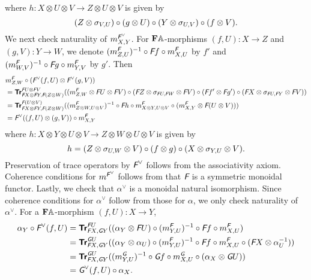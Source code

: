 where $h \colon X \otimes U \otimes V \to Z \otimes U \otimes V$ is given by
\begin{equation*}
  (Z \otimes \sigma_{V,U}) \circ (g \otimes U) \circ (Y \otimes \sigma_{U,V})
  \circ (f \otimes V).
\end{equation*}
We next check naturality of $m^{\textit{\textsf{F}}^{\vee}}_{X,Y}$. For
$\mathbf{F}\mathbb{A}$-morphisms $(f,U) \colon X \to Z$ and $(g,V) \colon Y
\to W$, we denote $(m^{\textit{\textsf{F}}}_{Z,U})^{-1} \circ \textit{\textsf{F}}f \circ m^{\textit{\textsf{F}}}_{X,U}$ by
$f'$ and $(m_{W,V}^{\textit{\textsf{F}}})^{-1} \circ \textit{\textsf{F}}g \circ m^{\textit{\textsf{F}}}_{Y,V}$ by $g'$. Then
\begin{align*}
  & m^{\textit{\textsf{F}}}_{Z,W} \circ (\textit{\textsf{F}}^{\vee}(f,U) \otimes \textit{\textsf{F}}^{\vee}(g,V)) \\
  &= {\normalfont\textsf{\textbf{Tr}}}^{\textit{\textsf{F}}U \otimes \textit{\textsf{F}}V}_{\textit{\textsf{F}}X \otimes \textit{\textsf{F}}Y,\textit{\textsf{F}}(Z \otimes W)}
  ((m^{\textit{\textsf{F}}}_{Z,W} \otimes \textit{\textsf{F}}U \otimes \textit{\textsf{F}}V) \circ
  (\textit{\textsf{F}}Z \otimes \sigma_{\textit{\textsf{F}}U,\textit{\textsf{F}}W} \otimes \textit{\textsf{F}}V) \circ
  (\textit{\textsf{F}}f' \otimes \textit{\textsf{F}}g') \circ
  (\textit{\textsf{F}}X \otimes \sigma_{\textit{\textsf{F}}U,\textit{\textsf{F}}Y} \otimes \textit{\textsf{F}}V)) \\
  &= {\normalfont\textsf{\textbf{Tr}}}^{\textit{\textsf{F}}(U \otimes V)}_{\textit{\textsf{F}}X \otimes \textit{\textsf{F}}Y,\textit{\textsf{F}}(Z \otimes W)}
  ((m_{Z \otimes W, U \otimes V}^{\textit{\textsf{F}}})^{-1} \circ
  \textit{\textsf{F}}h \circ
  m_{X \otimes Y, U \otimes V}^{\textit{\textsf{F}}} \circ
  (m_{X,Y}^{\textit{\textsf{F}}} \otimes \textit{\textsf{F}}(U \otimes V))) \\
  &= \textit{\textsf{F}}^{\vee}((f,U) \otimes (g,V)) \circ m^{\textit{\textsf{F}}}_{X,Y}
\end{align*}
where $h \colon X \otimes Y \otimes U \otimes V \to Z \otimes W \otimes U \otimes V$
is given by
\begin{equation*}
  h = (Z \otimes \sigma_{U,W} \otimes V) \circ (f \otimes g) \circ
  (X \otimes \sigma_{Y,U} \otimes V).
\end{equation*}
Preservation of trace operators by $\textit{\textsf{F}}^{\vee}$ follows from
the associativity axiom. Coherence conditions for
$m^{\textit{\textsf{F}}^{\vee}}$ follows from that $\textit{\textsf{F}}$ is a symmetric
monoidal functor. Lastly, we check that $\alpha^{\vee}$ is a
monoidal natural isomorphism. Since coherence conditions for
$\alpha^{\vee}$ follow from those for $\alpha$, we only check
naturality of $\alpha^{\vee}$. For a $\mathbf{F}\mathbb{A}$-morphism $(f,U)
\colon X \to Y$,
\begin{align*}
  \alpha_{Y} \circ \textit{\textsf{F}}^{\vee}(f,U)
  &= {\normalfont\textsf{\textbf{Tr}}}^{\textit{\textsf{F}}U}_{\textit{\textsf{F}}X,\textit{\textsf{G}}Y}
  ((\alpha_{Y} \otimes \textit{\textsf{F}}U) \circ
  (m^{\textit{\textsf{F}}}_{Y,U})^{-1} \circ \textit{\textsf{F}}f \circ m^{\textit{\textsf{F}}}_{X,U}) \\
  &= {\normalfont\textsf{\textbf{Tr}}}^{\textit{\textsf{G}}U}_{\textit{\textsf{F}}X,\textit{\textsf{G}}Y}((\alpha_{Y} \otimes \alpha_{U}) \circ
  (m^{\textit{\textsf{F}}}_{Y,U})^{-1} \circ \textit{\textsf{F}}f \circ m^{\textit{\textsf{F}}}_{X,U}
  \circ (\textit{\textsf{F}}X \otimes \alpha^{-1}_{U})) \\
  &= {\normalfont\textsf{\textbf{Tr}}}^{\textit{\textsf{G}}U}_{\textit{\textsf{F}}X,\textit{\textsf{G}}Y}((m^{\textit{\textsf{G}}}_{Y,U})^{-1} \circ
  \textit{\textsf{G}}f \circ m^{\textit{\textsf{G}}}_{X,U}
  \circ (\alpha_{X} \otimes \textit{\textsf{G}}U)) \\
  &= \textit{\textsf{G}}^{\vee} (f,U) \circ \alpha_{X}.
\end{align*}

